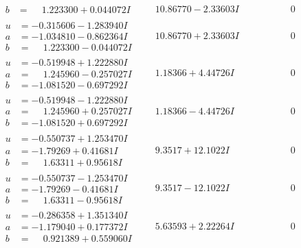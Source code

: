 \documentclass[1p]{elsarticle_modified}
\theoremstyle{definition}
\begin{document}
$$\begin{array}{c|c|c}
\begin{aligned}
b &= \phantom{-}1.223300 + 0.044072 I\end{aligned}
 & \phantom{-}10.86770 - 2.33603 I & \phantom{-0.000000 } 0 \\ \hline\begin{aligned}
u &= -0.315606 - 1.283940 I \\
a &= -1.034810 - 0.862364 I \\
b &= \phantom{-}1.223300 - 0.044072 I\end{aligned}
 & \phantom{-}10.86770 + 2.33603 I & \phantom{-0.000000 } 0 \\ \hline\begin{aligned}
u &= -0.519948 + 1.222880 I \\
a &= \phantom{-}1.245960 - 0.257027 I \\
b &= -1.081520 - 0.697292 I\end{aligned}
 & \phantom{-}1.18366 + 4.44726 I & \phantom{-0.000000 } 0 \\ \hline\begin{aligned}
u &= -0.519948 - 1.222880 I \\
a &= \phantom{-}1.245960 + 0.257027 I \\
b &= -1.081520 + 0.697292 I\end{aligned}
 & \phantom{-}1.18366 - 4.44726 I & \phantom{-0.000000 } 0 \\ \hline\begin{aligned}
u &= -0.550737 + 1.253470 I \\
a &= -1.79269 + 0.41681 I \\
b &= \phantom{-}1.63311 + 0.95618 I\end{aligned}
 & \phantom{-}9.3517 + 12.1022 I & \phantom{-0.000000 } 0 \\ \hline\begin{aligned}
u &= -0.550737 - 1.253470 I \\
a &= -1.79269 - 0.41681 I \\
b &= \phantom{-}1.63311 - 0.95618 I\end{aligned}
 & \phantom{-}9.3517 - 12.1022 I & \phantom{-0.000000 } 0 \\ \hline\begin{aligned}
u &= -0.286358 + 1.351340 I \\
a &= -1.179040 + 0.177372 I \\
b &= \phantom{-}0.921389 + 0.559060 I\end{aligned}
 & \phantom{-}5.63593 + 2.22264 I & \phantom{-0.000000 } 0 \\ \hline\begin{aligned}

\end{aligned}
\end{array}$$
\end{document}
